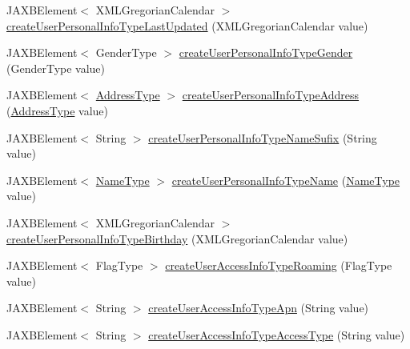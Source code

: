 \begin{DoxyCompactItemize}
\item 
JAXBElement$<$ XMLGregorianCalendar $>$ \hyperlink{classcom_1_1telefonica_1_1schemas_1_1unica_1_1rest_1_1directory_1_1v1_1_1ObjectFactory_a34584434e5d0abb2611133d18d7a4c1d}{createUserPersonalInfoTypeLastUpdated} (XMLGregorianCalendar value)
\item 
JAXBElement$<$ GenderType $>$ \hyperlink{classcom_1_1telefonica_1_1schemas_1_1unica_1_1rest_1_1directory_1_1v1_1_1ObjectFactory_a150fc5bda2bcd22b52b43317d9f536e4}{createUserPersonalInfoTypeGender} (GenderType value)
\item 
JAXBElement$<$ \hyperlink{classcom_1_1telefonica_1_1schemas_1_1unica_1_1rest_1_1common_1_1v1_1_1AddressType}{AddressType} $>$ \hyperlink{classcom_1_1telefonica_1_1schemas_1_1unica_1_1rest_1_1directory_1_1v1_1_1ObjectFactory_ae234771e790aff6eb519a1d27f34d619}{createUserPersonalInfoTypeAddress} (\hyperlink{classcom_1_1telefonica_1_1schemas_1_1unica_1_1rest_1_1common_1_1v1_1_1AddressType}{AddressType} value)
\item 
JAXBElement$<$ String $>$ \hyperlink{classcom_1_1telefonica_1_1schemas_1_1unica_1_1rest_1_1directory_1_1v1_1_1ObjectFactory_a23b7c718cd328a276f7ead22d1d7a5f8}{createUserPersonalInfoTypeNameSufix} (String value)
\item 
JAXBElement$<$ \hyperlink{classcom_1_1telefonica_1_1schemas_1_1unica_1_1rest_1_1directory_1_1v1_1_1NameType}{NameType} $>$ \hyperlink{classcom_1_1telefonica_1_1schemas_1_1unica_1_1rest_1_1directory_1_1v1_1_1ObjectFactory_a7313963b96c9bc0f9e8525e5dd39c3fe}{createUserPersonalInfoTypeName} (\hyperlink{classcom_1_1telefonica_1_1schemas_1_1unica_1_1rest_1_1directory_1_1v1_1_1NameType}{NameType} value)
\item 
JAXBElement$<$ XMLGregorianCalendar $>$ \hyperlink{classcom_1_1telefonica_1_1schemas_1_1unica_1_1rest_1_1directory_1_1v1_1_1ObjectFactory_ac426ea74a4ed920175dd2dbf23597f1a}{createUserPersonalInfoTypeBirthday} (XMLGregorianCalendar value)
\item 
JAXBElement$<$ FlagType $>$ \hyperlink{classcom_1_1telefonica_1_1schemas_1_1unica_1_1rest_1_1directory_1_1v1_1_1ObjectFactory_a789712c5eeea1cc2e8264f85fef929b0}{createUserAccessInfoTypeRoaming} (FlagType value)
\item 
JAXBElement$<$ String $>$ \hyperlink{classcom_1_1telefonica_1_1schemas_1_1unica_1_1rest_1_1directory_1_1v1_1_1ObjectFactory_a3d1aa9d5715fe809b3adcaab7e01757e}{createUserAccessInfoTypeApn} (String value)
\item 
JAXBElement$<$ String $>$ \hyperlink{classcom_1_1telefonica_1_1schemas_1_1unica_1_1rest_1_1directory_1_1v1_1_1ObjectFactory_a35b5242f37104043e5f7c341a9a841e3}{createUserAccessInfoTypeAccessType} (String value)

\end{DoxyCompactItemize}
